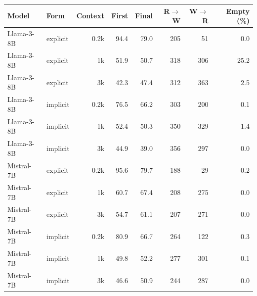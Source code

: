 \begin{tabular}{ll r rrrrr}
\toprule
Model & Form & Context & First & Final & R$\to$W & W$\to$R & Empty (\%) \\
\midrule
Llama-3-8B & explicit & 0.2k & 94.4 & 79.0 & 205 & 51 & 0.0 \\
Llama-3-8B & explicit & 1k & 51.9 & 50.7 & 318 & 306 & 25.2 \\
Llama-3-8B & explicit & 3k & 42.3 & 47.4 & 312 & 363 & 2.5 \\
Llama-3-8B & implicit & 0.2k & 76.5 & 66.2 & 303 & 200 & 0.1 \\
Llama-3-8B & implicit & 1k & 52.4 & 50.3 & 350 & 329 & 1.4 \\
Llama-3-8B & implicit & 3k & 44.9 & 39.0 & 356 & 297 & 0.0 \\
Mistral-7B & explicit & 0.2k & 95.6 & 79.7 & 188 & 29 & 0.2 \\
Mistral-7B & explicit & 1k & 60.7 & 67.4 & 208 & 275 & 0.0 \\
Mistral-7B & explicit & 3k & 54.7 & 61.1 & 207 & 271 & 0.0 \\
Mistral-7B & implicit & 0.2k & 80.9 & 66.7 & 264 & 122 & 0.3 \\
Mistral-7B & implicit & 1k & 49.8 & 52.2 & 277 & 301 & 0.1 \\
Mistral-7B & implicit & 3k & 46.6 & 50.9 & 244 & 287 & 0.0 \\
\bottomrule
\end{tabular}
